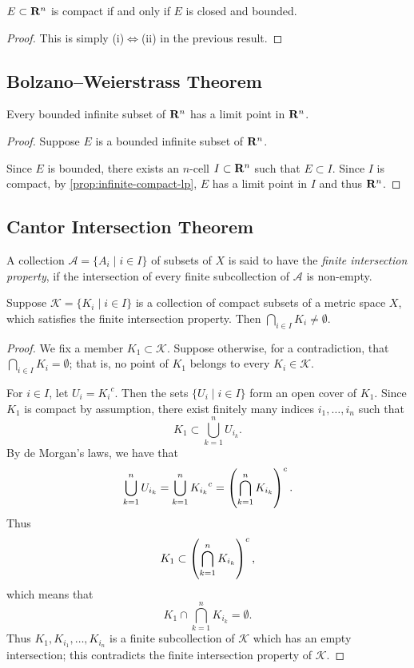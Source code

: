 \begin{theorem}\label{thrm:heine-borel}
$E\subset\mathbf R^n$ is compact if and only if $E$ is closed and bounded.
\end{theorem}

\begin{proof}
This is simply (i)$\iff$(ii) in the previous result.
\end{proof}

\subsection{Bolzano--Weierstrass Theorem}
\begin{theorem}\label{thrm:bolzano-weierstrass}
Every bounded infinite subset of $\mathbf R^n$ has a limit point in $\mathbf R^n$.
\end{theorem}

\begin{proof}
Suppose $E$ is a bounded infinite subset of $\mathbf R^n$.

Since $E$ is bounded, there exists an $n$-cell $I\subset\mathbf R^n$ such that $E\subset I$. Since $I$ is compact, by \cref{prop:infinite-compact-lp}, $E$ has a limit point in $I$ and thus $\mathbf R^n$. 
\end{proof}

\subsection{Cantor Intersection Theorem}
A collection $\mathcal{A}=\{A_i\mid i\in I\}$ of subsets of $X$ is said to have the \emph{finite intersection property}, if the intersection of every finite subcollection of $\mathcal{A}$ is non-empty.

\begin{proposition}\label{prop:finite-intersection-property}
Suppose $\mathcal{K}=\{K_i\mid i\in I\}$ is a collection of compact subsets of a metric space $X$, which satisfies the finite intersection property. Then $\bigcap_{i\in I}K_i\neq\emptyset$.
\end{proposition}

\begin{proof}
We fix a member $K_1\subset\mathcal{K}$. Suppose otherwise, for a contradiction, that $\bigcap_{i\in I}K_i=\emptyset$; that is, no point of $K_1$ belongs to every $K_i\in\mathcal{K}$. 

For $i\in I$, let $U_i={K_i}^c$. Then the sets $\{U_i\mid i\in I\}$ form an open cover of $K_1$. Since $K_1$ is compact by assumption, there exist finitely many indices $i_1,\dots,i_n$ such that
\[K_1\subset\bigcup_{k=1}^{n}U_{i_k}.\]
By de Morgan's laws, we have that
\[\bigcup_{k=1}^{n}U_{i_k}=\bigcup_{k=1}^{n}{K_{i_k}}^c=\left(\bigcap_{k=1}^{n}K_{i_k}\right)^c.\]
Thus
\[K_1\subset\left(\bigcap_{k=1}^{n}K_{i_k}\right)^c,\]
which means that
\[K_1\cap\bigcap_{k=1}^{n}K_{i_k}=\emptyset.\]
Thus $K_1,K_{i_1},\dots,K_{i_n}$ is a finite subcollection of $\mathcal{K}$ which has an empty intersection; this contradicts the finite intersection property of $\mathcal{K}$.
\end{proof}

